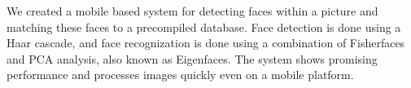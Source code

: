 We created a mobile based system for detecting faces within a picture
and matching these faces to a precompiled database.  Face detection is
done using a Haar cascade, and face recognization is done using a
combination of Fisherfaces and PCA analysis, also known as Eigenfaces.
The system shows promising performance and processes images quickly
even on a mobile platform.

